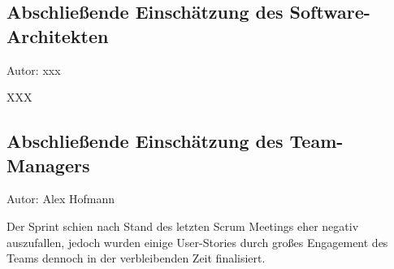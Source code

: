 \subsection{Abschließende Einschätzung des Software-Architekten}
{\small Autor: xxx}

XXX

\subsection{Abschließende Einschätzung des Team-Managers}
{\small Autor: Alex Hofmann}

Der Sprint schien nach Stand des letzten Scrum Meetings eher negativ auszufallen, jedoch wurden einige User-Stories durch großes Engagement des Teams dennoch in der verbleibenden Zeit finalisiert.


